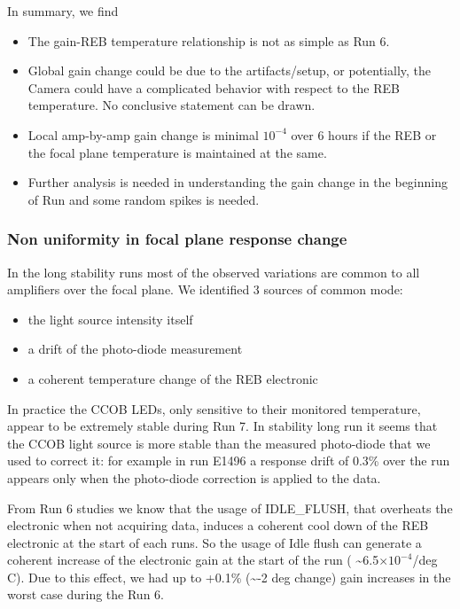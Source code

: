 In summary, we find
\begin{itemize}
    \item The gain-REB temperature relationship is not as simple as Run 6.
    \item Global gain change could be due to the artifacts/setup, or potentially, the Camera could have a complicated behavior with respect to the REB temperature. No conclusive statement can be drawn.
    \item Local amp-by-amp gain change is minimal $10^{-4}$ over 6 hours if the REB or the focal plane temperature is maintained at the same.
    \item Further analysis is needed in understanding the gain change in the beginning of Run and some random spikes is needed.
\end{itemize}

\clearpage

\subsubsection{Non uniformity in focal plane response change}\label{sec:gain-stability-3}
In the long stability runs most of the observed variations are common to all amplifiers over the focal plane. We identified  3 sources of common mode: 
\begin{itemize} 
\item the light source intensity itself 
\item a drift of the photo-diode measurement 
\item a coherent temperature change of the REB electronic 
\end{itemize}

In practice the CCOB LEDs, only sensitive to their monitored temperature, appear to be extremely stable during Run 7.  In stability long run  it seems that the CCOB light source is more stable than the measured photo-diode that we used to correct it: for example in run E1496 a response drift of 0.3\% over the run appears only when the photo-diode correction is applied to the data.

From Run 6 studies we know that the usage of IDLE\_FLUSH, that overheats the electronic when not acquiring data, induces  a coherent cool down of the REB electronic at the start of each runs. So  the usage of Idle flush can generate a coherent increase of the electronic gain at the start of the run ( \textasciitilde 6.5$\times 10^{-4}$/deg C).  Due to this effect, we had up to +0.1\% (\textasciitilde-2 deg change) gain increases in the worst case  during the Run 6.  

